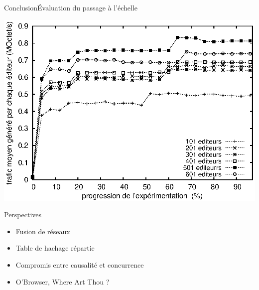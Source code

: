 \begin{frame}{Conclusion}{Évaluation du passage à l'échelle}

  \begin{center}
    \includegraphics[width=1\textwidth]{img/editor/communication.eps}
  \end{center}

\end{frame}


\begin{frame}{Perspectives}

  \begin{itemize}   
  \item Fusion de réseaux
  \item Table de hachage répartie
  \item Compromis entre causalité et concurrence
  \item O'Browser, Where Art Thou ?
  \end{itemize}

\end{frame}